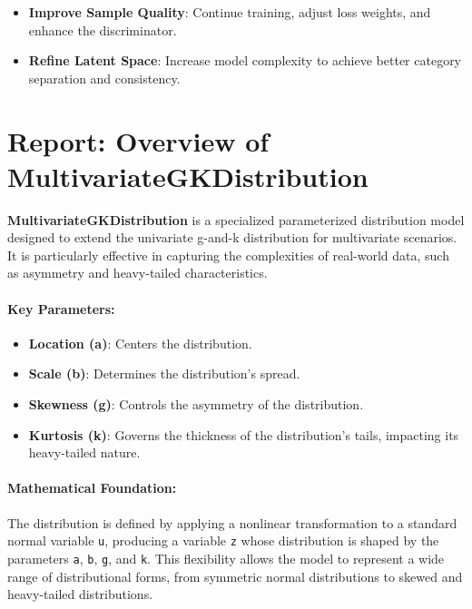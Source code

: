 \documentclass[11pt]{article}
\providecommand{\tightlist}{%
      \setlength{\itemsep}{0pt}\setlength{\parskip}{0pt}}
\begin{document}
\begin{itemize}
\tightlist
\item
  \textbf{Improve Sample Quality}: Continue training, adjust loss
  weights, and enhance the discriminator.
\item
  \textbf{Refine Latent Space}: Increase model complexity to achieve
  better category separation and consistency.
\end{itemize}

    \section{Report: Overview of
MultivariateGKDistribution}\label{report-overview-of-multivariategkdistribution}

\textbf{MultivariateGKDistribution} is a specialized parameterized
distribution model designed to extend the univariate g-and-k
distribution for multivariate scenarios. It is particularly effective in
capturing the complexities of real-world data, such as asymmetry and
heavy-tailed characteristics.

\paragraph{Key Parameters:}\label{key-parameters}

\begin{itemize}
\tightlist
\item
  \textbf{Location (a)}: Centers the distribution.
\item
  \textbf{Scale (b)}: Determines the distribution's spread.
\item
  \textbf{Skewness (g)}: Controls the asymmetry of the distribution.
\item
  \textbf{Kurtosis (k)}: Governs the thickness of the distribution's
  tails, impacting its heavy-tailed nature.
\end{itemize}

\paragraph{Mathematical Foundation:}\label{mathematical-foundation}

The distribution is defined by applying a nonlinear transformation to a
standard normal variable \texttt{u}, producing a variable \texttt{z}
whose distribution is shaped by the parameters \texttt{a}, \texttt{b},
\texttt{g}, and \texttt{k}. This flexibility allows the model to
represent a wide range of distributional forms, from symmetric normal
distributions to skewed and heavy-tailed distributions.
\end{document}
